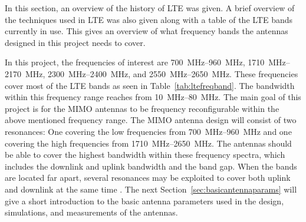 \begin{aautail}
    In this section, an overview of the history of LTE was given. A brief overview of the techniques used in LTE was also given along with a table of the LTE bands currently in use. This gives an overview of what frequency bands the antennas designed in this project needs to cover.

    In this project, the frequencies of interest are \SIrange{700}{960}{MHz}, \SIrange{1710}{2170}{MHz}, \SIrange{2300}{2400}{MHz}, and \SIrange{2550}{2650}{MHz}. These frequencies cover most of the LTE bands as seen in Table~\ref{tab:ltefreqband}. The bandwidth within this frequency range reaches from \SIrange{10}{80}{MHz}. The main goal of this project is for the MIMO antennas to be frequency reconfigurable within the above mentioned frequency range. The MIMO antenna design will consist of two resonances: One covering the low frequencies from \SIrange{700}{960}{MHz} and one covering the high frequencies from \SIrange{1710}{2650}{MHz}. The antennas should be able to cover the highest bandwidth within these frequency spectra, which includes the downlink and uplink bandwidth and the band gap. When the bands are located far apart, several resonances may be exploited to cover both uplink and downlink at the same time \cite{radio2015electronics}. The next Section~\ref{sec:basicantennaparams} will give a short introduction to the basic antenna parameters used in the design, simulations, and measurements of the antennas.
\end{aautail}
